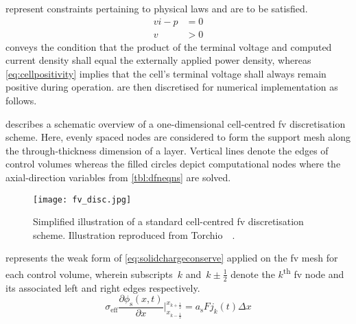       represent constraints
    pertaining to physical laws and are to be satisfied.
    \begin{align}
	    vi  - p & = 0 \label{eq:ctspowerconstraint} \\
	    v       & > 0 \label{eq:cellpositivity}
    \end{align}
      conveys  the  condition that  the  product  of
    the  terminal  voltage   and  computed  current  density   shall  equal  the
    externally applied  power density, whereas  \cref{eq:cellpositivity} implies
    that  the  cell's  terminal  voltage shall  always  remain  positive  during
    operation.     are
    then discretised for numerical implementation as follows.

     describes  a schematic  overview of  a one-dimensional
    cell-centred \gls{fv}  discretisation scheme. Here, evenly  spaced nodes are
    considered to form the support mesh along the through-thickness dimension of
    a  layer.  Vertical  lines  denote  the edges  of  control  volumes  whereas
    the  filled circles  depict  computational nodes  where the  axial-direction
    variables from \cref{tbl:dfneqns} are solved.

    \begin{figure}[!htbp]
        \centering
        \texttt{[image: fv\_disc.jpg]}
        \caption[Illustration of a cell-centred \gls{fv} discretisation mesh]{Simplified illustration of a standard cell-centred \gls{fv}
            discretisation scheme. Illustration reproduced from
        Torchio~\etal~\cite{Torchio2016}.}
        \label{fig:1d_fv_mesh}
    \end{figure}

          represents     the      weak     form      of
    \cref{eq:solidchargeconserve}  applied   on  the  \gls{fv}  mesh   for  each
    control  volume, wherein  subscripts~$k$  and~$k\pm\frac{1}{2}$ denote  the
    $k$\textsuperscript{th}  \gls{fv} node  and  its associated  left and  right
    edges respectively.
    \begin{equation} \label{eq:discretisedPhiS}
        \sigma_{\text{eff}} \frac{\partial \phi_\text{s}(x,t)}{\partial x}\Bigg|_{x_{k-\frac{1}{2}}}^{x_{k+\frac{1}{2}}} = a_\text{s} F j_k(t) \Delta x
    \end{equation}


